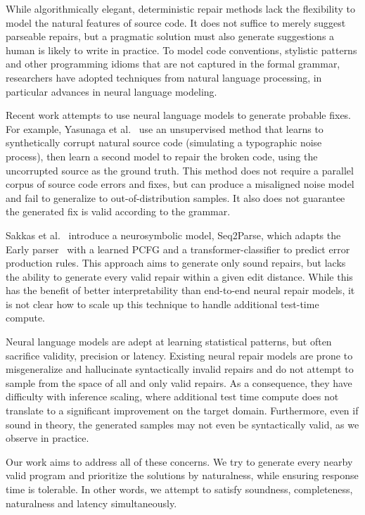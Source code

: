 While algorithmically elegant, deterministic repair methods lack the flexibility to model the natural features of source code. It does not suffice to merely suggest parseable repairs, but a pragmatic solution must also generate suggestions a human is likely to write in practice. To model code conventions, stylistic patterns and other programming idioms that are not captured in the formal grammar, researchers have adopted techniques from natural language processing, in particular advances in neural language modeling.

Recent work attempts to use neural language models to generate probable fixes. For example, Yasunaga et al.~\cite{yasunaga2021break} use an unsupervised method that learns to synthetically corrupt natural source code (simulating a typographic noise process), then learn a second model to repair the broken code, using the uncorrupted source as the ground truth. This method does not require a parallel corpus of source code errors and fixes, but can produce a misaligned noise model and fail to generalize to out-of-distribution samples. It also does not guarantee the generated fix is valid according to the grammar.

Sakkas et al.~\cite{sakkas2022seq2parse} introduce a neurosymbolic model, Seq2Parse, which adapts the Early parser~\cite{earley1970efficient} with a learned PCFG and a transformer-classifier to predict error production rules. This approach aims to generate only sound repairs, but lacks the ability to generate every valid repair within a given edit distance. While this has the benefit of better interpretability than end-to-end neural repair models, it is not clear how to scale up this technique to handle additional test-time compute.

Neural language models are adept at learning statistical patterns, but often sacrifice validity, precision or latency. Existing neural repair models are prone to misgeneralize and hallucinate syntactically invalid repairs and do not attempt to sample from the space of all and only valid repairs. As a consequence, they have difficulty with inference scaling, where additional test time compute does not translate to a significant improvement on the target domain. Furthermore, even if sound in theory, the generated samples may not even be syntactically valid, as we observe in practice.

Our work aims to address all of these concerns. We try to generate every nearby valid program and prioritize the solutions by naturalness, while ensuring response time is tolerable. In other words, we attempt to satisfy soundness, completeness, naturalness and latency simultaneously.

